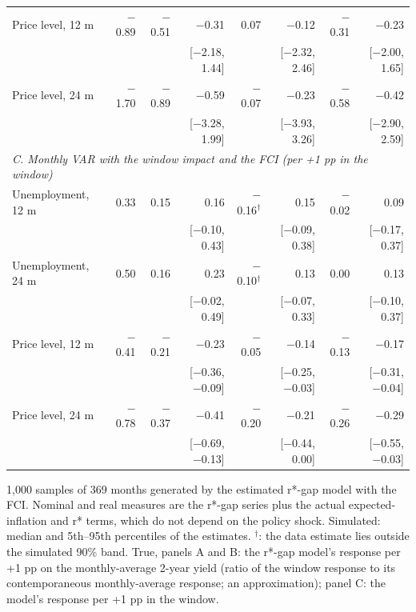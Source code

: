 \begin{table}[p]
\begin{tabular}{lrrrrrrr}
\quad Price level, 12 m & $-$0.89 & $-$0.51 & $-$0.31 & 0.07 & $-$0.12 & $-$0.31 & $-$0.23\\
 &  &  & {\scriptsize [$-$2.18, 1.44]} &  & {\scriptsize [$-$2.32, 2.46]} &  & {\scriptsize [$-$2.00, 1.65]}\\
\quad Price level, 24 m & $-$1.70 & $-$0.89 & $-$0.59 & $-$0.07 & $-$0.23 & $-$0.58 & $-$0.42\\
 &  &  & {\scriptsize [$-$3.28, 1.99]} &  & {\scriptsize [$-$3.93, 3.26]} &  & {\scriptsize [$-$2.90, 2.59]}\\
\multicolumn{8}{l}{\textit{C. Monthly VAR with the window impact and the FCI (per +1 pp in the window)}}\\
\quad Unemployment, 12 m & 0.33 & 0.15 & 0.16 & $-$0.16$^{\dagger}$ & 0.15 & $-$0.02 & 0.09\\
 &  &  & {\scriptsize [$-$0.10, 0.43]} &  & {\scriptsize [$-$0.09, 0.38]} &  & {\scriptsize [$-$0.17, 0.37]}\\
\quad Unemployment, 24 m & 0.50 & 0.16 & 0.23 & $-$0.10$^{\dagger}$ & 0.13 & 0.00 & 0.13\\
 &  &  & {\scriptsize [$-$0.02, 0.49]} &  & {\scriptsize [$-$0.07, 0.33]} &  & {\scriptsize [$-$0.10, 0.37]}\\
\quad Price level, 12 m & $-$0.41 & $-$0.21 & $-$0.23 & $-$0.05 & $-$0.14 & $-$0.13 & $-$0.17\\
 &  &  & {\scriptsize [$-$0.36, $-$0.09]} &  & {\scriptsize [$-$0.25, $-$0.03]} &  & {\scriptsize [$-$0.31, $-$0.04]}\\
\quad Price level, 24 m & $-$0.78 & $-$0.37 & $-$0.41 & $-$0.20 & $-$0.21 & $-$0.26 & $-$0.29\\
 &  &  & {\scriptsize [$-$0.69, $-$0.13]} &  & {\scriptsize [$-$0.44, 0.00]} &  & {\scriptsize [$-$0.55, $-$0.03]}\\
\bottomrule\end{tabular}
\par\smallskip\parbox{0.96\linewidth}{\scriptsize 1,000 samples of 369 months generated by the estimated r*-gap model with the FCI. Nominal and real measures are the r*-gap series plus the actual expected-inflation and r* terms, which do not depend on the policy shock. Simulated: median and 5th--95th percentiles of the estimates. $^{\dagger}$: the data estimate lies outside the simulated 90\% band. True, panels A and B: the r*-gap model's response per +1 pp on the monthly-average 2-year yield (ratio of the window response to its contemporaneous monthly-average response; an approximation); panel C: the model's response per +1 pp in the window.}
\end{table}
